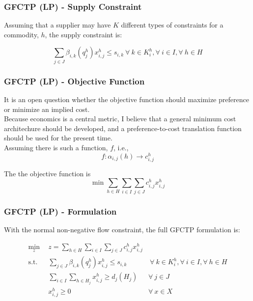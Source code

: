 \begin{frame}[ctb!]
  \frametitle{GFCTP (LP) - Supply Constraint}
  
  Assuming that a supplier may have $K$ different types of constraints for a
  commodity, $h$, the supply constraint is:

  \begin{equation}
    \sum_{j \in J}\beta_{i,k}(q_{j}^{h}) x_{i,j}^{h} \leq s_{i,k} 
    \: \forall \: k \in K_{i}^{h},  
    \forall \: i \in I, \forall \: h \in H
  \end{equation}

\end{frame}

\begin{frame}[ctb!]
  \frametitle{GFCTP (LP) - Objective Function}

  It is an open question whether the objective function should maximize
  preference or minimize an implied cost.\\

  Because economics is a central metric, I believe that a general minimum cost
  architechure should be developed, and a preference-to-cost translation
  function should be used for the present time.\\

  Assuming there is such a function, $f$, i.e.,
  \begin{equation}
    f : \alpha_{i,j}(h) \to c_{i,j}^{h}
  \end{equation}

  The the objective function is
  \begin{equation}
    \min \sum_{h \in H}\sum_{i \in I}\sum_{j \in J}c_{i,j}^{h} x_{i,j}^{h} 
  \end{equation}

\end{frame}

\begin{frame}[ctb!]
  \frametitle{GFCTP (LP) - Formulation} 

  With the normal non-negative flow constraint, the full GFCTP formulation is:
  
  \begin{subequations}\label{eqs:GFCTP-LP}
    \begin{align}
      \min_{z} \:\: & 
      z = \sum_{h \in H}\sum_{i \in I}\sum_{j \in J}c_{i,j}^{h} x_{i,j}^{h} 
      & \label{eqs:GFCTP-LP_obj} \\
      \text{s.t.} \:\: &
      \sum_{j \in J}\beta_{i,k}(q_{j}^{h}) x_{i,j}^{h} \leq s_{i,k} 
      &
      \: \forall \: k \in K_{i}^{h},  
      \forall \: i \in I, \forall \: h \in H \label{eqs:GFCTP-LP_sup} \\
      &
      \sum_{i \in I}\sum_{h \in H_{j}} x_{i,j}^{h} \geq d_{j}(H_{j}) 
      & 
      \forall \: j \in J \label{eqs:GFCTP-LP_dem} \\
      &
      x^h_{i,j} \geq 0
      &
      \forall \: x \in X \label{eqs:GFCTP-LP_x}
    \end{align}
  \end{subequations}
\end{frame}

